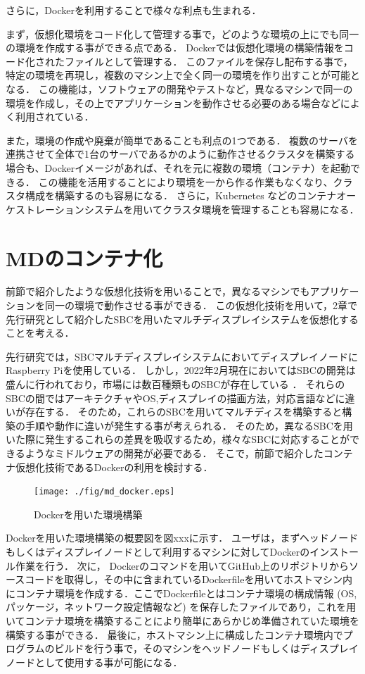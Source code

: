 さらに，Dockerを利用することで様々な利点も生まれる．

まず，仮想化環境をコード化して管理する事で，どのような環境の上にでも同一の環境を作成する事ができる点である．
Dockerでは仮想化環境の構築情報をコード化されたファイルとして管理する．
このファイルを保存し配布する事で，特定の環境を再現し，複数のマシン上で全く同一の環境を作り出すことが可能となる．
この機能は，ソフトウェアの開発やテストなど，異なるマシンで同一の環境を作成し，その上でアプリケーションを動作させる必要のある場合などによく利用されている．

また，環境の作成や廃棄が簡単であることも利点の1つである．
複数のサーバを連携させて全体で1台のサーバであるかのように動作させるクラスタを構築する場合も、Dockerイメージがあれば、それを元に複数の環境（コンテナ）を起動できる．
この機能を活用することにより環境を一から作る作業もなくなり、クラスタ構成を構築するのも容易になる．
さらに，Kubernetes \cite{k8s}などのコンテナオーケストレーションシステムを用いてクラスタ環境を管理することも容易になる．



\section{MDのコンテナ化}
前節で紹介したような仮想化技術を用いることで，異なるマシンでもアプリケーションを同一の環境で動作させる事ができる．
この仮想化技術を用いて，2章で先行研究として紹介したSBCを用いたマルチディスプレイシステムを仮想化することを考える．

先行研究では，SBCマルチディスプレイシステムにおいてディスプレイノードにRaspberry Piを使用している．
しかし，2022年2月現在においてはSBCの開発は盛んに行われており，市場には数百種類ものSBCが存在している \cite{hackerbords}．
それらのSBCの間ではアーキテクチャやOS,ディスプレイの描画方法，対応言語などに違いが存在する．
そのため，これらのSBCを用いてマルチディスを構築すると構築の手順や動作に違いが発生する事が考えられる．
そのため，異なるSBCを用いた際に発生するこれらの差異を吸収するため，様々なSBCに対応することができるようなミドルウェアの開発が必要である．
そこで，前節で紹介したコンテナ仮想化技術であるDockerの利用を検討する．

\begin{figure}[H]
    \hspace*{\fill}
    \texttt{[image: ./fig/md\_docker.eps]}
    \hspace*{\fill}
    \caption{Dockerを用いた環境構築}
\end{figure}

Dockerを用いた環境構築の概要図を図xxxに示す．
ユーザは，まずヘッドノードもしくはディスプレイノードとして利用するマシンに対してDockerのインストール作業を行う．
次に， Dockerのコマンドを用いてGitHub上のリポジトリからソースコードを取得し，その中に含まれているDockerfileを用いてホストマシン内にコンテナ環境を作成する．ここでDockerfileとはコンテナ環境の構成情報 (OS, パッケージ，ネットワーク設定情報など) を保存したファイルであり，これを用いてコンテナ環境を構築することにより簡単にあらかじめ準備されていた環境を構築する事ができる．
最後に，ホストマシン上に構成したコンテナ環境内でプログラムのビルドを行う事で，そのマシンをヘッドノードもしくはディスプレイノードとして使用する事が可能になる．

